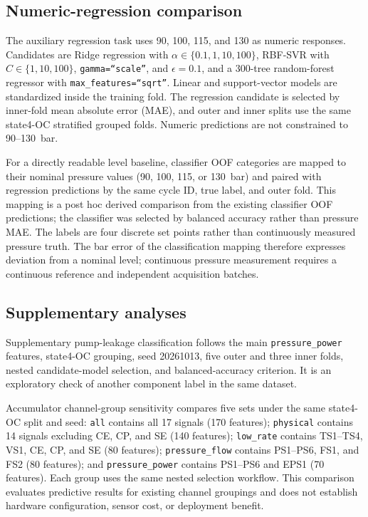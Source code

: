 \documentclass[11pt,a4paper]{article}
\newcommand{\code}[1]{\texttt{#1}}
\begin{document}
\subsection{Numeric-regression comparison}

The auxiliary regression task uses 90, 100, 115, and 130 as numeric responses. Candidates are Ridge regression with $\alpha\in\{0.1,1,10,100\}$, RBF-SVR with $C\in\{1,10,100\}$, \code{gamma=``scale''}, and $\epsilon=0.1$, and a 300-tree random-forest regressor with \code{max\_features=``sqrt''}. Linear and support-vector models are standardized inside the training fold. The regression candidate is selected by inner-fold mean absolute error (MAE), and outer and inner splits use the same state4-OC stratified grouped folds. Numeric predictions are not constrained to 90--130~bar.

For a directly readable level baseline, classifier OOF categories are mapped to their nominal pressure values (90, 100, 115, or 130~bar) and paired with regression predictions by the same cycle ID, true label, and outer fold. This mapping is a post hoc derived comparison from the existing classifier OOF predictions; the classifier was selected by balanced accuracy rather than pressure MAE. The labels are four discrete set points rather than continuously measured pressure truth. The bar error of the classification mapping therefore expresses deviation from a nominal level; continuous pressure measurement requires a continuous reference and independent acquisition batches.

\subsection{Supplementary analyses}

Supplementary pump-leakage classification follows the main \code{pressure\_power} features, state4-OC grouping, seed 20261013, five outer and three inner folds, nested candidate-model selection, and balanced-accuracy criterion. It is an exploratory check of another component label in the same dataset.

Accumulator channel-group sensitivity compares five sets under the same state4-OC split and seed: \code{all} contains all 17 signals (170 features); \code{physical} contains 14 signals excluding CE, CP, and SE (140 features); \code{low\_rate} contains TS1--TS4, VS1, CE, CP, and SE (80 features); \code{pressure\_flow} contains PS1--PS6, FS1, and FS2 (80 features); and \code{pressure\_power} contains PS1--PS6 and EPS1 (70 features). Each group uses the same nested selection workflow. This comparison evaluates predictive results for existing channel groupings and does not establish hardware configuration, sensor cost, or deployment benefit.
\end{document}
